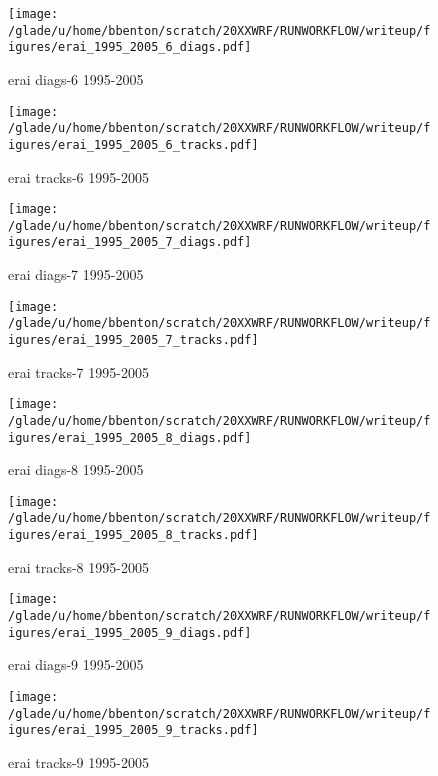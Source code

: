 \begin{figure}[!tbp]
\centering
\begin{minipage}[b]{0.45\textwidth}
\texttt{[image: /glade/u/home/bbenton/scratch/20XXWRF/RUNWORKFLOW/writeup/figures/erai\_1995\_2005\_6\_diags.pdf]}
\caption{erai diags-6 1995-2005}
\end{minipage}
\hfill
\begin{minipage}[b]{0.45\textwidth}
\texttt{[image: /glade/u/home/bbenton/scratch/20XXWRF/RUNWORKFLOW/writeup/figures/erai\_1995\_2005\_6\_tracks.pdf]}
\caption{erai tracks-6 1995-2005}
\end{minipage}
\end{figure}

\begin{figure}[!tbp]
\centering
\begin{minipage}[b]{0.45\textwidth}
\texttt{[image: /glade/u/home/bbenton/scratch/20XXWRF/RUNWORKFLOW/writeup/figures/erai\_1995\_2005\_7\_diags.pdf]}
\caption{erai diags-7 1995-2005}
\end{minipage}
\hfill
\begin{minipage}[b]{0.45\textwidth}
\texttt{[image: /glade/u/home/bbenton/scratch/20XXWRF/RUNWORKFLOW/writeup/figures/erai\_1995\_2005\_7\_tracks.pdf]}
\caption{erai tracks-7 1995-2005}
\end{minipage}
\end{figure}

\begin{figure}[!tbp]
\centering
\begin{minipage}[b]{0.45\textwidth}
\texttt{[image: /glade/u/home/bbenton/scratch/20XXWRF/RUNWORKFLOW/writeup/figures/erai\_1995\_2005\_8\_diags.pdf]}
\caption{erai diags-8 1995-2005}
\end{minipage}
\hfill
\begin{minipage}[b]{0.45\textwidth}
\texttt{[image: /glade/u/home/bbenton/scratch/20XXWRF/RUNWORKFLOW/writeup/figures/erai\_1995\_2005\_8\_tracks.pdf]}
\caption{erai tracks-8 1995-2005}
\end{minipage}
\end{figure}

\begin{figure}[!tbp]
\centering
\begin{minipage}[b]{0.45\textwidth}
\texttt{[image: /glade/u/home/bbenton/scratch/20XXWRF/RUNWORKFLOW/writeup/figures/erai\_1995\_2005\_9\_diags.pdf]}
\caption{erai diags-9 1995-2005}
\end{minipage}
\hfill
\begin{minipage}[b]{0.45\textwidth}
\texttt{[image: /glade/u/home/bbenton/scratch/20XXWRF/RUNWORKFLOW/writeup/figures/erai\_1995\_2005\_9\_tracks.pdf]}
\caption{erai tracks-9 1995-2005}
\end{minipage}
\end{figure}

